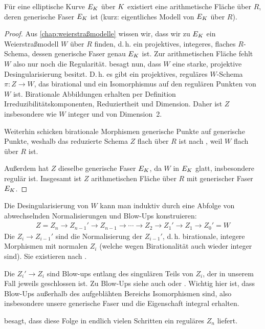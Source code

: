 \documentclass[german, bibliography=totoc]{scrreprt}
\begin{document}
\begin{Satz}\label{thm:exarithfl}
  Für eine elliptische Kurve $E_{K}$ über $K$ existiert eine
  arithmetische Fläche über $R$, deren generische Faser $E_{K}$ ist
  (kurz: eigentliches Modell von $E_{K}$ über $R$).
  \begin{proof}
    Aus \autoref{chap:weierstraßmodelle} wissen wir, dass wir zu $E_{K}$
    ein Weierstraßmodell $W$ über $R$ finden, d.\,h. ein projektives,
    integeres, flaches $R$-Schema, dessen generische Faser genau
    $E_{K}$ ist. Zur arithmetischen Fläche fehlt $W$ also nur
    noch die Regularität.
    \cite[Corollary 8.3.51]{liu} besagt nun, dass $W$ eine starke,
    projektive Desingularisierung besitzt. D.\,h. es gibt ein
    projektives, reguläres $W$-Schema $\pi\colon Z\to W$, das
    birational und ein Isomorphismus auf den regulären Punkten von $W$
    ist.
    Birationale Abbildungen erhalten per Definition
    Irreduzibilitätskomponenten, Reduziertheit und Dimension.
    Daher ist $Z$ insbesondere wie $W$ integer
    und von Dimension~2.

    Weiterhin schicken birationale Morphismen generische Punkte auf
    generische Punkte, weshalb das reduzierte Schema $Z$ flach über
    $R$ ist nach \cite[Proposition III.9.7]{hartshorne}, weil
    $W$ flach über $R$ ist.

    Außerdem hat $Z$ dieselbe generische Faser $E_{K}$, da
    $W$ in $E_{K}$ glatt, insbesondere regulär ist.
    Insgesamt ist $Z$ arithmetischen Fläche über $R$ mit
    generischer Faser $E_{K}$.
  \end{proof}
\end{Satz}

\begin{Bemerkung}\label{bem:konstruktioneigmodell}
  Die Desingularisierung von $W$ kann man induktiv durch eine
  Abfolge von abwechselnden Normalisierungen und Blow-Ups konstruieren:
  \begin{gather*}
    Z=Z_{n}\to Z_{n-1}'\to Z_{n-1}\to\dotsb
    \to Z_{2}\to Z_{1}'\to Z_{1}\to Z_{0}'=W
  \end{gather*}
  Die $Z_i\to Z_{i-1}'$ sind die Normalisierung der $Z_{i-1}'$,
  d.\,h. birationale, integere Morphismen mit normalen $Z_{i}$ (welche
  wegen Birationalität auch wieder integer sind). Sie existieren nach
  \cite[Proposition 4.1.22]{liu}.
  
  Die $Z_{i}'\to Z_{i}$ sind Blow-ups entlang des singulären Teils von
  $Z_{i}$, der in unserem Fall jeweils geschlossen ist.
  Zu Blow-Ups siehe auch
  \cite[Chapter 8.1]{liu} oder \cite[Chapter 13.19]{wedhorn}.
  Wichtig hier ist, dass Blow-Ups außerhalb des aufgeblähten Bereichs
  Isomorphismen sind, also insbesondere unsere generische Faser und
  die Eigenschaft integral erhalten.

  \cite[Corollary 8.3.51]{liu} besagt, dass diese Folge in endlich
  vielen Schritten ein reguläres $Z_{n}$ liefert.
\end{Bemerkung}
\end{document}
